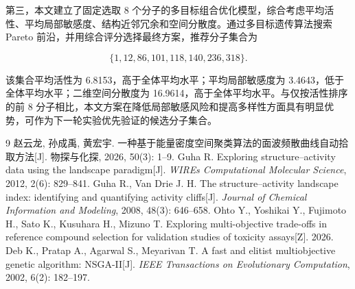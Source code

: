\documentclass[withoutpreface,bwprint]{cumcmthesis}
\begin{document}
第三，本文建立了固定选取 8 个分子的多目标组合优化模型，综合考虑平均活性、平均局部敏感度、结构近邻冗余和空间分散度。通过多目标遗传算法搜索 Pareto 前沿，并用综合评分选择最终方案，推荐分子集合为

\[
\{1,12,86,101,118,140,236,318\}.
\]

该集合平均活性为 6.8153，高于全体平均水平；平均局部敏感度为 3.4643，低于全体平均水平；二维空间分散度为 16.9614，高于全体平均水平。与仅按活性排序的前 8 分子相比，本文方案在降低局部敏感风险和提高多样性方面具有明显优势，可作为下一轮实验优先验证的候选分子集合。


\begin{thebibliography}{9}
 赵云龙, 孙成禹, 黄宏宇. 一种基于能量密度空间聚类算法的面波频散曲线自动拾取方法[J]. 物探与化探, 2026, 50(3): 1--9.
 Guha R. Exploring structure--activity data using the landscape paradigm[J]. \textit{WIREs Computational Molecular Science}, 2012, 2(6): 829--841.
 Guha R., Van Drie J. H. The structure--activity landscape index: identifying and quantifying activity cliffs[J]. \textit{Journal of Chemical Information and Modeling}, 2008, 48(3): 646--658.
 Ohto Y., Yoshikai Y., Fujimoto H., Sato K., Kusuhara H., Mizuno T. Exploring multi-objective trade-offs in reference compound selection for validation studies of toxicity assays[Z]. 2026.
 Deb K., Pratap A., Agarwal S., Meyarivan T. A fast and elitist multiobjective genetic algorithm: NSGA-II[J]. \textit{IEEE Transactions on Evolutionary Computation}, 2002, 6(2): 182--197.
\end{thebibliography}
\end{document}
